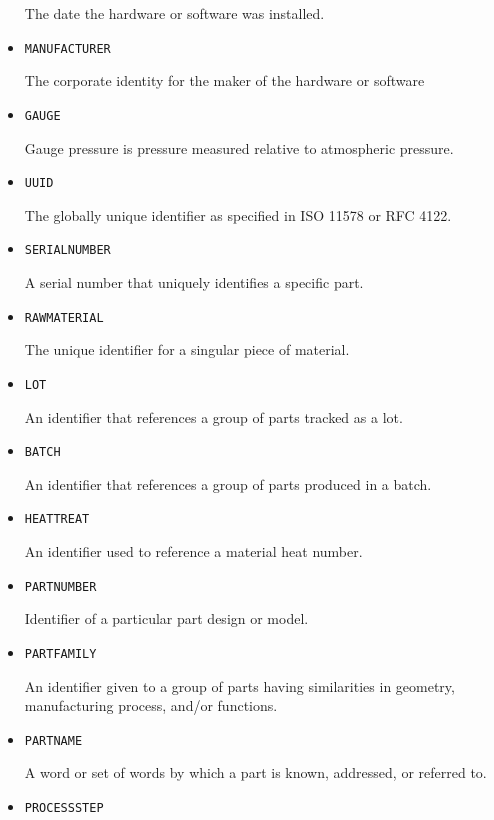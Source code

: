 \begin{itemize}
The date the hardware or software was installed.


\item \texttt{MANUFACTURER}  

The corporate identity for the maker of the hardware or software


\item \texttt{GAUGE}  

Gauge pressure is pressure measured relative to atmospheric pressure.


\item \texttt{UUID}  

The globally unique identifier as specified in ISO 11578 or RFC 4122.


\item \texttt{SERIAL\textunderscore NUMBER}  

A serial number that uniquely identifies a specific part.


\item \texttt{RAW\textunderscore MATERIAL}  

The unique identifier for a singular piece of material.


\item \texttt{LOT}  

An identifier that references a group of parts tracked as a lot.


\item \texttt{BATCH}  

An identifier that references a group of parts produced in a batch.


\item \texttt{HEAT\textunderscore TREAT}  

An identifier used to reference a material heat number.


\item \texttt{PART\textunderscore NUMBER}  

Identifier of a particular part design or model.


\item \texttt{PART\textunderscore FAMILY}  

An identifier given to a group of parts having similarities in geometry, manufacturing process, and/or functions.


\item \texttt{PART\textunderscore NAME}  

A word or set of words by which a part is known, addressed, or referred to.


\item \texttt{PROCESS\textunderscore STEP}  


\end{itemize}
